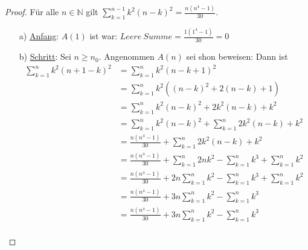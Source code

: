 \documentclass{exam}
\begin{document}
\begin{proof}
	Für alle $n \in \mathbb{N}$ gilt $\sum_{k = 1}^{n - 1} k^2(n - k)^2 = \frac{n(n^4 - 1)}{30}$.
	\begin{enumerate}
		\item[a)] \underline{Anfang}: $A(1)$ ist war: $Leere\ Summe = \frac{1(1^4 - 1)}{30} = 0$
		\item[b)] \underline{Schritt}: Sei $n \ge n_0$. Angenommen $A(n)$ sei shon beweisen: Dann ist
		      \begin{align}
			      \sum_{k = 1}^{n} k^2(n + 1 - k)^2 & = \sum_{k = 1}^{n} k^2(n - k + 1)^2                                                      \\
			                                        & = \sum_{k = 1}^{n} k^2((n - k)^2 + 2(n-k)+ 1)                                            \\
			                                        & = \sum_{k = 1}^{n} k^2(n - k)^2 + 2k^2(n-k) + k^2                                        \\
			                                        & = \sum_{k = 1}^{n} k^2(n - k)^2 + \sum_{k=1}^{n} 2k^2(n-k) + k^2                         \\
			                                        & = \frac{n(n^4 - 1)}{30} + \sum_{k=1}^{n} 2k^2(n-k) + k^2                                 \\
			                                        & = \frac{n(n^4 - 1)}{30} + \sum_{k=1}^{n} 2nk^2 - \sum_{k=1}^{n} k^3 + \sum_{k=1}^{n} k^2 \\
			                                        & = \frac{n(n^4 - 1)}{30} + 2n\sum_{k=1}^{n} k^2 - \sum_{k=1}^{n} k^3 + \sum_{k=1}^{n} k^2 \\
			                                        & = \frac{n(n^4 - 1)}{30} + 3n\sum_{k=1}^{n} k^2 - \sum_{k=1}^{n} k^3                      \\
			                                        & = \frac{n(n^4 - 1)}{30} + 3n\sum_{k=1}^{n} k^2 - \sum_{k=1}^{n} k^3                      \\
		      \end{align}
	\end{enumerate}
\end{proof}
\end{document}
